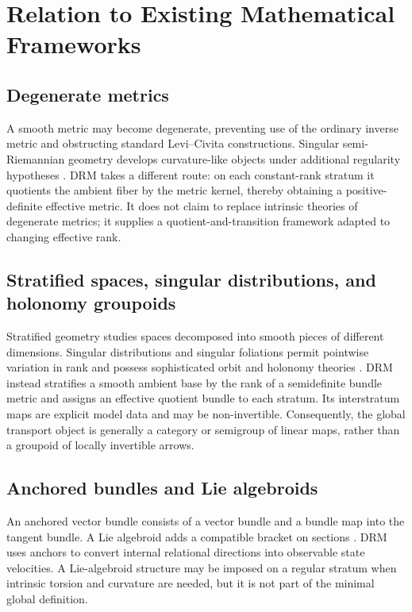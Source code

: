 \documentclass[11pt]{article}
\begin{document}
\section{Relation to Existing Mathematical Frameworks}
\label{sec:related}

\subsection{Degenerate metrics}

A smooth metric may become degenerate, preventing use of the ordinary inverse
metric and obstructing standard Levi--Civita constructions. Singular
semi-Riemannian geometry develops curvature-like objects under additional
regularity hypotheses \cite{Stoica2014}. DRM takes a different route: on each
constant-rank stratum it quotients the ambient fiber by the metric kernel,
thereby obtaining a positive-definite effective metric. It does not claim to
replace intrinsic theories of degenerate metrics; it supplies a
quotient-and-transition framework adapted to changing effective rank.

\subsection{Stratified spaces, singular distributions, and holonomy groupoids}

Stratified geometry studies spaces decomposed into smooth pieces of different
dimensions. Singular distributions and singular foliations permit pointwise
variation in rank and possess sophisticated orbit and holonomy theories
\cite{Sussmann1973,AndroulidakisSkandalis2009}. DRM instead stratifies a smooth
ambient base by the rank of a semidefinite bundle metric and assigns an
effective quotient bundle to each stratum. Its interstratum maps are explicit
model data and may be non-invertible. Consequently, the global transport
object is generally a category or semigroup of linear maps, rather than a
groupoid of locally invertible arrows.

\subsection{Anchored bundles and Lie algebroids}

An anchored vector bundle consists of a vector bundle and a bundle map into
the tangent bundle. A Lie algebroid adds a compatible bracket on sections
\cite{Mackenzie2005}. DRM uses anchors to convert internal relational
directions into observable state velocities. A Lie-algebroid structure may be
imposed on a regular stratum when intrinsic torsion and curvature are needed,
but it is not part of the minimal global definition.
\end{document}
